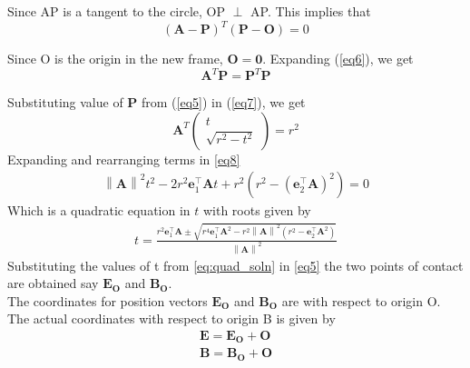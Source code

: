 \documentclass[journal,10pt,twocolumn]{article}
\providecommand{\norm}[1]{\left\lVert#1\right\rVert}
\let\vec\mathbf
\newcommand{\myvec}[1]{\ensuremath{\begin{pmatrix}#1\end{pmatrix}}}
\begin{document}
{Since AP is a tangent to the circle, OP $\perp$ AP. This implies that
\begin{equation}
	(\vec{A}-\vec{P})^T(\vec{P}-\vec{O}) = 0
	\label{eq6}
\end{equation}

Since O is the origin in the new frame, $\vec{O} = \vec{0}$. Expanding (\ref{eq6}), we get 
\begin{equation}
	\vec{A}^T\vec{P} = \vec{P}^T\vec{P}
	\label{eq7}
\end{equation}

Substituting value of $\vec{P}$ from (\ref{eq5}) in (\ref{eq7}), we get
\begin{equation}
	\vec{A}^T\myvec{t \\ \sqrt{r^2-t^2}} = r^2	
	\label{eq8}
\end{equation}
Expanding and rearranging terms in \eqref{eq8}
\begin{multline}
	\norm{\vec{A}}^2t^2-2r^2\vec{e}_1^\top\vec{A}t+r^2(r^2-(\vec{e}_2^\top\vec{A})^2) = 0
	\label{eq:quad_t}
\end{multline}
Which is a quadratic equation in $t$ with roots given by
\begin{align}
	t = \frac{r^2\vec{e}_1^\top\vec{A}\pm\sqrt{r^4\vec{e}_1^\top\vec{A}^2-r^2\norm{\vec{A}}^2(r^2-\vec{e}_2^\top\vec{A}^2)}}{\norm{\vec{A}}^2}
	\label{eq:quad_soln}
\end{align}
Substituting the values of t from \eqref{eq:quad_soln} in \eqref{eq5} the two points of contact are obtained say $\vec{E_O}$ and $\vec{B_O}$.\\

The coordinates for position vectors $\vec{E_O}$ and $\vec{B_O}$ are with respect to origin O. The actual coordinates with respect to origin B is given by 
\begin{eqnarray}
	\vec{E} = \vec{E_O} + \vec{O}\\
	\vec{B} = \vec{B_O} + \vec{O}
\end{eqnarray}

}
\end{document}
